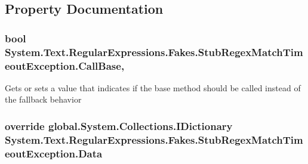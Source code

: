 \subsection{Property Documentation}
\hypertarget{class_system_1_1_text_1_1_regular_expressions_1_1_fakes_1_1_stub_regex_match_timeout_exception_a6a730a7cf7322604f3c9c2e223c6860d}{
\subsubsection[{Call\-Base}]{\setlength{\rightskip}{0pt plus 5cm}bool System.\-Text.\-Regular\-Expressions.\-Fakes.\-Stub\-Regex\-Match\-Timeout\-Exception.\-Call\-Base\hspace{0.3cm}{\ttfamily [get]}, {\ttfamily [set]}}}\label{class_system_1_1_text_1_1_regular_expressions_1_1_fakes_1_1_stub_regex_match_timeout_exception_a6a730a7cf7322604f3c9c2e223c6860d}


Gets or sets a value that indicates if the base method should be called instead of the fallback behavior

\hypertarget{class_system_1_1_text_1_1_regular_expressions_1_1_fakes_1_1_stub_regex_match_timeout_exception_adcf659f0a991cc0431db21efe0b9b003}{
\subsubsection[{Data}]{\setlength{\rightskip}{0pt plus 5cm}override global.\-System.\-Collections.\-I\-Dictionary System.\-Text.\-Regular\-Expressions.\-Fakes.\-Stub\-Regex\-Match\-Timeout\-Exception.\-Data\hspace{0.3cm}{\ttfamily [get]}}}\label{class_system_1_1_text_1_1_regular_expressions_1_1_fakes_1_1_stub_regex_match_timeout_exception_adcf659f0a991cc0431db21efe0b9b003}


